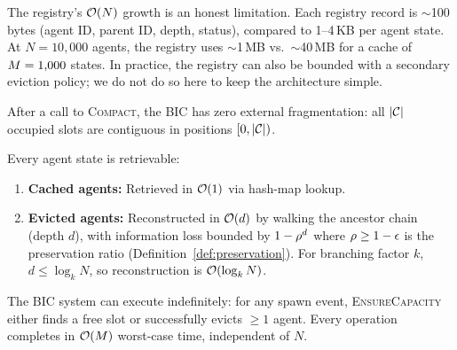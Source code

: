 \begin{remark}
The registry's $\mathcal{O}(N)$ growth is an honest limitation.  Each registry
record is $\sim$100 bytes (agent ID, parent ID, depth, status),
compared to 1--4\,KB per agent state.  At $N = 10{,}000$ agents, the
registry uses $\sim$1\,MB vs.\ $\sim$40\,MB for a cache of
$M=1{,}000$ states.  In practice, the registry can also be bounded
with a secondary eviction policy; we do not do so here to keep the
architecture simple.
\end{remark}

\begin{theorem}[Fragmentation]
\label{thm:frag}
After a call to \textsc{Compact}, the BIC has zero external
fragmentation: all $|\mathcal{C}|$ occupied slots are contiguous in
positions $[0, |\mathcal{C}|)$.
\end{theorem}

\begin{theorem}[Retrievability]
\label{thm:retrieve}
Every agent state is retrievable:
\begin{enumerate}
  \item[(a)] \textbf{Cached agents:} Retrieved in $\mathcal{O}(1)$ via hash-map
    lookup.
  \item[(b)] \textbf{Evicted agents:} Reconstructed in $\mathcal{O}(d)$ by
    walking the ancestor chain (depth $d$), with information
    loss bounded by $1 - \rho^d$ where $\rho \geq 1-\epsilon$
    is the preservation ratio (Definition~\ref{def:preservation}).
    For branching factor $k$, $d \leq \log_k N$, so
    reconstruction is $\mathcal{O}(\log_k N)$.
\end{enumerate}
\end{theorem}

\begin{theorem}
\label{thm:liveness}
The BIC system can execute indefinitely: for any spawn event,
\textsc{EnsureCapacity} either finds a free slot or successfully
evicts $\geq 1$ agent.  Every operation completes in $\mathcal{O}(M)$
worst-case time, independent of $N$.
\end{theorem}
